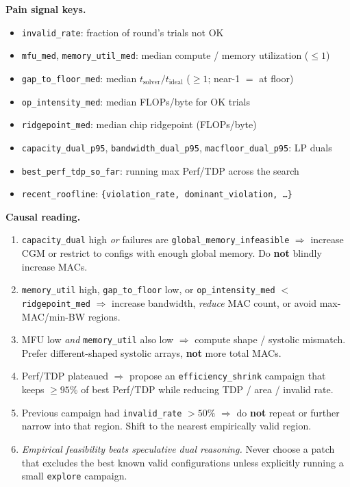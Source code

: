 \begin{tcolorbox}
\medskip
\textbf{Pain signal keys.}
\begin{itemize}[leftmargin=1.4em, itemsep=1pt, topsep=2pt]
    \item \texttt{invalid\_rate}: fraction of round's trials not OK
    \item \texttt{mfu\_med}, \texttt{memory\_util\_med}: median compute / memory utilization ($\leq 1$)
    \item \texttt{gap\_to\_floor\_med}: median $t_{\mathrm{solver}} / t_{\mathrm{ideal}}$ ($\geq 1$; near-1 $=$ at floor)
    \item \texttt{op\_intensity\_med}: median FLOPs/byte for OK trials
    \item \texttt{ridgepoint\_med}: median chip ridgepoint (FLOPs/byte)
    \item \texttt{capacity\_dual\_p95}, \texttt{bandwidth\_dual\_p95}, \texttt{macfloor\_dual\_p95}: LP duals
    \item \texttt{best\_perf\_tdp\_so\_far}: running max Perf/TDP across the search
    \item \texttt{recent\_roofline}: \texttt{\{violation\_rate, dominant\_violation, \ldots\}}
\end{itemize}

\medskip
\textbf{Causal reading.}
\begin{enumerate}[leftmargin=1.6em, itemsep=2pt, topsep=2pt]
    \item \texttt{capacity\_dual} high \emph{or} failures are
          \texttt{global\_memory\_infeasible} $\Rightarrow$ increase CGM
          or restrict to configs with enough global memory. Do \textbf{not}
          blindly increase MACs.
    \item \texttt{memory\_util} high, \texttt{gap\_to\_floor} low, or
          \texttt{op\_intensity\_med} $<$ \texttt{ridgepoint\_med}
          $\Rightarrow$ increase bandwidth, \emph{reduce} MAC count, or
          avoid max-MAC/min-BW regions.
    \item MFU low \emph{and} \texttt{memory\_util} also low $\Rightarrow$
          compute shape / systolic mismatch. Prefer different-shaped
          systolic arrays, \textbf{not} more total MACs.
    \item Perf/TDP plateaued $\Rightarrow$ propose an
          \texttt{efficiency\_shrink} campaign that keeps $\geq 95\%$ of
          best Perf/TDP while reducing TDP / area / invalid rate.
    \item Previous campaign had \texttt{invalid\_rate} $> 50\%$
          $\Rightarrow$ do \textbf{not} repeat or further narrow into that
          region. Shift to the nearest empirically valid region.
    \item \emph{Empirical feasibility beats speculative dual reasoning.}
          Never choose a patch that excludes the best known valid
          configurations unless explicitly running a small \texttt{explore}
          campaign.
\end{enumerate}


\end{tcolorbox}
